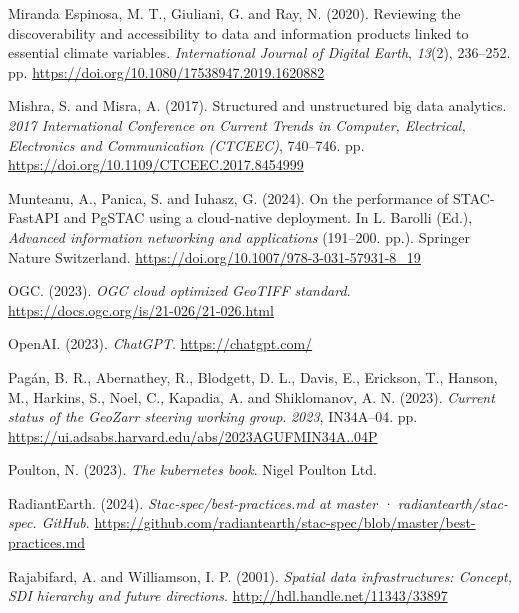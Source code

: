 \documentclass[
  oneside,
  open=any]{scrbook}
\newlength{\cslhangindent}
\newenvironment{CSLReferences}[2] %
 {\begin{list}{}{%
  \setlength{\itemindent}{0pt}
  \setlength{\leftmargin}{0pt}
  \setlength{\parsep}{0pt}
  \ifodd #1
   \setlength{\leftmargin}{\cslhangindent}
   \setlength{\itemindent}{-1\cslhangindent}
  \fi
  \setlength{\itemsep}{#2\baselineskip}}}
 {\end{list}}
\begin{document}
\begin{CSLReferences}{1}{0}
Miranda Espinosa, M. T., Giuliani, G. and Ray, N. (2020). Reviewing the
discoverability and accessibility to data and information products
linked to essential climate variables. \emph{International Journal of
Digital Earth}, \emph{13}(2), 236--252. pp.
\url{https://doi.org/10.1080/17538947.2019.1620882}

Mishra, S. and Misra, A. (2017). Structured and unstructured big data
analytics. \emph{2017 International Conference on Current Trends in
Computer, Electrical, Electronics and Communication ({CTCEEC})},
740--746. pp. \url{https://doi.org/10.1109/CTCEEC.2017.8454999}

Munteanu, A., Panica, S. and Iuhasz, G. (2024). On the performance of
{STAC}-{FastAPI} and {PgSTAC} using a cloud-native deployment. In L.
Barolli (Ed.), \emph{Advanced information networking and applications}
(191--200. pp.). Springer Nature Switzerland.
\url{https://doi.org/10.1007/978-3-031-57931-8_19}

OGC. (2023). \emph{{OGC} cloud optimized {GeoTIFF} standard}.
\url{https://docs.ogc.org/is/21-026/21-026.html}

OpenAI. (2023). \emph{{ChatGPT}}. \url{https://chatgpt.com/}

Pagán, B. R., Abernathey, R., Blodgett, D. L., Davis, E., Erickson, T.,
Hanson, M., Harkins, S., Noel, C., Kapadia, A. and Shiklomanov, A. N.
(2023). \emph{Current status of the {GeoZarr} steering working group}.
\emph{2023}, IN34A--04. pp.
\url{https://ui.adsabs.harvard.edu/abs/2023AGUFMIN34A..04P}

Poulton, N. (2023). \emph{The kubernetes book}. Nigel Poulton Ltd.

RadiantEarth. (2024). \emph{Stac-spec/best-practices.md at master ·
radiantearth/stac-spec. {GitHub}}.
\url{https://github.com/radiantearth/stac-spec/blob/master/best-practices.md}

Rajabifard, A. and Williamson, I. P. (2001). \emph{Spatial data
infrastructures: Concept, {SDI} hierarchy and future directions}.
\url{http://hdl.handle.net/11343/33897}


\end{CSLReferences}
\end{document}
